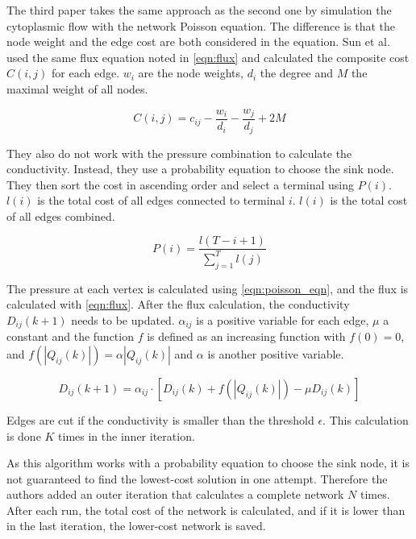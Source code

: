 The third paper \cite{sun_fast_2016} takes the same approach as the second one by simulation the cytoplasmic flow with the network Poisson equation. The difference is that the node weight and the edge cost are both considered in the equation. Sun et al. used the same flux equation noted in \autoref{eqn:flux} and calculated the composite cost $C(i,j)$ for each edge. $w_i$ are the node weights, $d_i$ the degree and $M$ the maximal weight of all nodes.

\begin{equation}
    \label{eqn:composite_cost_eqn}
    C(i,j) = c_{ij} - \frac{w_i}{d_i} - \frac{w_j}{d_j} + 2M
\end{equation}

They also do not work with the pressure combination to calculate the conductivity. Instead, they use a probability equation to choose the sink node. They then sort the cost in ascending order and select a terminal using $P(i)$. $l(i)$ is the total cost of all edges connected to terminal $i$. $l(i)$ is the total cost of all edges combined.

\begin{equation}
    \label{eqn:probability_eqn}
    P(i) = \frac{l(T-i+1)}{\sum\limits_{j = 1}^Tl(j)}
\end{equation}

The pressure at each vertex is calculated using \autoref{eqn:poisson_eqn}, and the flux is calculated with \autoref{eqn:flux}. After the flux calculation, the conductivity $D_{ij}(k+1)$ needs to be updated. $\alpha_{ij}$ is a positive variable for each edge, $\mu$ a constant and the function $f$ is defined as an increasing function with $f(0) = 0$, and $f(|Q_{ij}(k)|) = \alpha |Q_{ij}(k)|$ and $\alpha$ is another positive variable.

\begin{equation}
    \label{eqn:conductivity_update_eqn}
    D_{ij}(k+1) = \alpha_{ij} \cdot [D_{ij}(k) + f(|Q_{ij}(k)|) - \mu D_{ij}(k)]
\end{equation}

Edges are cut if the conductivity is smaller than the threshold $\epsilon$. This calculation is done $K$ times in the inner iteration.

As this algorithm works with a probability equation to choose the sink node, it is not guaranteed to find the lowest-cost solution in one attempt. Therefore the authors added an outer iteration that calculates a complete network $N$ times. After each run, the total cost of the network is calculated, and if it is lower than in the last iteration, the lower-cost network is saved. 

